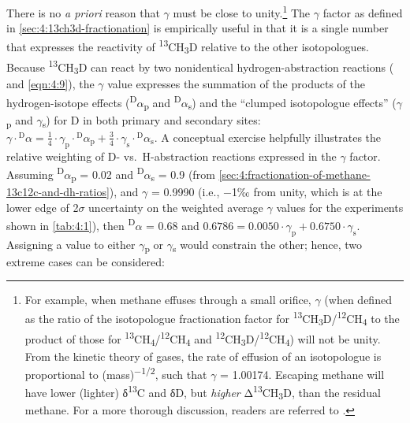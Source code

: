 There is no \emph{a priori} reason that $\gamma$ must be close to
unity.\footnote{For example, when methane effuses through a small
	orifice, $\gamma$ (when defined as the ratio of the isotopologue
	fractionation factor for
	\textsuperscript{13}CH\textsubscript{3}D/\textsuperscript{12}CH\textsubscript{4}
	to the product of those for
	\textsuperscript{13}CH\textsubscript{4}/\textsuperscript{12}CH\textsubscript{4}
	and
	\textsuperscript{12}CH\textsubscript{3}D/\textsuperscript{12}CH\textsubscript{4})
	will not be unity. From the kinetic theory of gases, the rate of
	effusion of an isotopologue is proportional to
	(mass)\textsuperscript{$-$1/2}, such that $\gamma$ = 1.00174. Escaping methane
	will have lower (lighter) δ\textsuperscript{13}C and δD, but
	\emph{higher} Δ\textsuperscript{13}CH\textsubscript{3}D, than the
	residual methane. For a more thorough discussion, readers are referred
	to \textcite{Eiler+Schauble_2004_GCA}.} The $\gamma$ factor as defined in \autoref{sec:4:13ch3d-fractionation}
is empirically useful in that it is a single number that expresses the
reactivity of \textsuperscript{13}CH\textsubscript{3}D relative to the
other isotopologues. Because \textsuperscript{13}CH\textsubscript{3}D
can react by two nonidentical hydrogen-abstraction reactions ( and \ref{eqn:4:9}), the $\gamma$ value expresses the summation of the products of the
hydrogen-isotope effects (\textsuperscript{D}$\alpha$\textsubscript{p} and
\textsuperscript{D}$\alpha$\textsubscript{s}) and the ``clumped isotopologue
effects'' ($\gamma$\textsubscript{p} and $\gamma$\textsubscript{s}) for D in both
primary and secondary sites:
\(\gamma \cdot{}_{}^{\mathrm{D}}\alpha = \frac{1}{4} \cdot \gamma_{\mathrm{p}} \cdot{}_{}^{\mathrm{D}}\alpha_{\mathrm{p}} + \frac{3}{4} \cdot \gamma_{\mathrm{s}} \cdot{}_{}^{\mathrm{D}}\alpha_{\mathrm{s}}\).
A conceptual exercise helpfully illustrates the relative weighting of D-
vs.\ H-abstraction reactions expressed in the $\gamma$ factor. Assuming
\textsuperscript{D}$\alpha$\textsubscript{p} = 0.02 and
\textsuperscript{D}$\alpha$\textsubscript{s} = 0.9 (from \autoref{sec:4:fractionation-of-methane-13c12c-and-dh-ratios}), and $\gamma$ =
0.9990 (i.e., $-$1‰ from unity, which is at the lower edge of 2$\sigma$
uncertainty on the weighted average $\gamma$ values for the experiments shown
in \autoref{tab:4:1}), then \textsuperscript{D}$\alpha$ = 0.68 and
\(0.6786 = 0.0050 \cdot \gamma_{\mathrm{p}} + 0.6750 \cdot \gamma_{\mathrm{s}}\).
Assigning a value to either $\gamma$\textsubscript{p} or $\gamma$\textsubscript{s}
would constrain the other; hence, two extreme cases can be considered:
